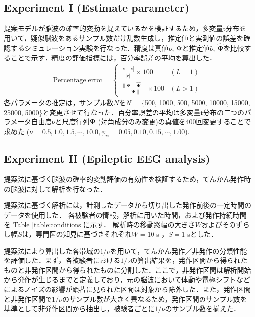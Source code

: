 \documentclass[journal]{IEEEtran}
\begin{document}
\subsection{Experiment I (Estimate parameter) }
提案モデルが脳波の確率的変動を捉えているかを検証するため，多変量t分布を用いて，疑似脳波をあるサンプル数だけ乱数生成し，推定値と実測値の誤差を確認するシミュレーション実験を行なった．精度は真値$\nu$, $\mathbf{\Psi}$と推定値$\hat{\nu}$, $\hat{\mathbf{\Psi}}$を比較することで示す．精度の評価指標には，百分率誤差の平均を算出した．
\begin{eqnarray}%
	\mathrm{Percentage\;error} = \begin{cases}
    \displaystyle  \frac{|\nu-\hat{\nu}|}{|\nu|}\times100 & (L=1)\\
    \displaystyle \frac{\|\mathbf{\Psi}-\hat{\mathbf{\Psi}}\|}{\|\mathbf{\Psi}\|}\times100 & (L>1)
\end{cases}
\end{eqnarray}
各パラメータの推定は，サンプル数$N$を$N$ = \{500, 1000, 500, 5000, 10000, 15000, 25000, 5000\}と変更させて行なった．百分率誤差の平均は多変量t分布の二つのパラメータ自由度$\nu$と尺度行列$\mathbf{\Psi}$ (対角成分のみ変更)の真値を400回変更することで求めた ($\nu=0.5,1.0,1.5,\cdots,10.0, \psi_{ii} =0.05, 0.10, 0.15,\cdots, 1.00$).

\subsection{Experiment II (Epileptic EEG analysis)}
提案法に基づく脳波の確率的変動評価の有効性を検証するため，てんかん発作時の脳波に対して解析を行なった．

提案法に基づく解析には，計測したデータから切り出した発作前後の一定時間のデータを使用した．
各被験者の情報，解析に用いた時間，および発作持続時間を Table \ref{table:conditions}に示す．
解析時の移動窓幅の大きさ$W$およびそのずらし幅$S$は，専門医の知見に基づきそれぞれ$W = 10$ s ，$S = 1$ sとした．

提案法により算出した各帯域の$1/\nu$を用いて，てんかん発作／非発作の分類性能を評価した．まず，各被験者における$1/\nu$の算出結果を，発作区間から得られたものと非発作区間から得られたものに分割した．ここで，非発作区間は解析開始から発作が生じるまでと定義しており，元の脳波において体動や電極シフトなどによるノイズの影響が顕著に見られた区間は対象から除外した．また，発作区間と非発作区間で$1/\nu$のサンプル数が大きく異なるため，発作区間のサンプル数を基準として非発作区間から抽出し，被験者ごとに$1/\nu$のサンプル数を揃えた．
\end{document}
